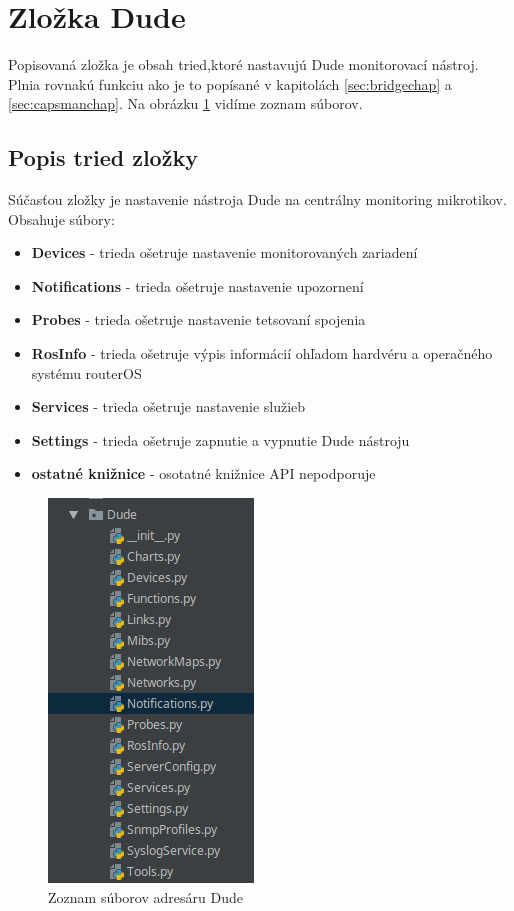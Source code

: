 \section{Zložka Dude}
Popisovaná zložka je obsah tried,ktoré nastavujú Dude monitorovací nástroj. Plnia rovnakú funkciu ako je to popísané v kapitolách \ref{sec:bridgechap} a \ref{sec:capsmanchap}. Na obrázku \ref{fig:dude} vidíme zoznam súborov. 
\subsection{Popis tried zložky}
Súčasťou zložky je nastavenie nástroja Dude na centrálny monitoring mikrotikov. Obsahuje súbory:\begin{itemize}
\item \textbf{Devices} - trieda ošetruje nastavenie monitorovaných zariadení
\item \textbf{Notifications} - trieda ošetruje nastavenie upozornení
\item \textbf{Probes} - trieda ošetruje nastavenie tetsovaní spojenia
\item \textbf{RosInfo} - trieda ošetruje výpis informácií ohľadom hardvéru a operačného systému routerOS
\item \textbf{Services} - trieda ošetruje nastavenie služieb
\item \textbf{Settings} - trieda ošetruje zapnutie a vypnutie Dude nástroju
\item \textbf{ostatné knižnice} - osotatné knižnice API nepodporuje
\end{itemize}
\begin{figure}[H]
\centering
\includegraphics[scale=0.6]{../text/dude.png}
\caption{Zoznam súborov adresáru Dude}
\label{fig:dude}
\end{figure}
